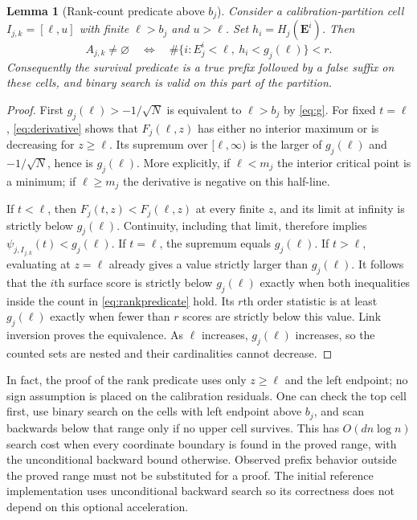 \documentclass[11pt]{article}
\newtheorem{lemma}[theorem]{Lemma}
\newcommand{\E}{\mathbf E}
\begin{document}
\begin{lemma}[Rank-count predicate above $b_j$]\label{lem:binary}
Consider a calibration-partition cell $I_{j,k}=[\ell,u]$ with finite
$\ell>b_j$ and $u>\ell$. Set $h_i=H_j(\E^i)$. Then
\begin{equation}\label{eq:rankpredicate}
 A_{j,k}\ne\varnothing\quad\Longleftrightarrow\quad
 \#\{i:E^i_j<\ell,\ h_i<g_j(\ell)\}<r.
\end{equation}
Consequently the survival predicate is a true prefix followed by a false suffix
on these cells, and binary search is valid on this part of the partition.
\end{lemma}
\begin{proof}
First $g_j(\ell)>-1/\sqrt N$ is equivalent to $\ell>b_j$ by
\eqref{eq:g}. For fixed $t=\ell$, \eqref{eq:derivative} shows that
$F_j(\ell,z)$ has either no interior maximum or is decreasing for $z\ge\ell$.
Its supremum over $[\ell,\infty)$ is the larger of $g_j(\ell)$ and
$-1/\sqrt N$, hence is $g_j(\ell)$. More explicitly, if $\ell<m_j$ the
interior critical point is a minimum; if $\ell\ge m_j$ the derivative is
negative on this half-line.

If $t<\ell$, then $F_j(t,z)<F_j(\ell,z)$ at every finite $z$, and its limit
at infinity is strictly below $g_j(\ell)$. Continuity, including that limit,
therefore implies $\psi_{j,I_{j,k}}(t)<g_j(\ell)$. If $t=\ell$, the supremum
equals $g_j(\ell)$. If $t>\ell$, evaluating at $z=\ell$ already gives a value
strictly larger than $g_j(\ell)$. It follows that the $i$th surface score is
strictly below $g_j(\ell)$ exactly when both inequalities inside the count in
\eqref{eq:rankpredicate} hold. Its $r$th order statistic is at least
$g_j(\ell)$ exactly when fewer than $r$ scores are strictly below this value.
Link inversion proves the equivalence. As $\ell$ increases, $g_j(\ell)$
increases, so the counted sets are nested and their cardinalities cannot decrease.
\end{proof}
In fact, the proof of the rank predicate uses only $z\ge\ell$ and the left
endpoint; no sign assumption is placed on the calibration residuals.
One can check the top cell first, use binary search on the cells with left
endpoint above $b_j$, and scan backwards below that range only if no upper
cell survives. This has $O(dn\log n)$ search cost when every coordinate boundary
is found in the proved range, with the unconditional backward bound otherwise.
Observed prefix behavior outside the proved range must not be substituted for
a proof. The initial reference implementation uses unconditional backward search
so its correctness does not depend on this optional acceleration.
\end{document}
